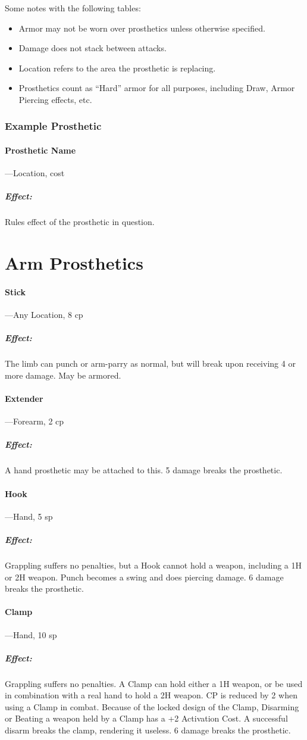 \documentclass[oneside,11pt,english]{book}
\begin{document}
Some notes with the following tables: 
\begin{itemize}
\item Armor may not be worn over prosthetics unless otherwise specified. 
\item Damage does not stack between attacks. 
\item Location refers to the area the prosthetic is replacing. 
\item Prosthetics count as “Hard” armor for all purposes, including Draw, Armor Piercing effects, etc.
\end{itemize}

\subsubsection{Example Prosthetic}
\vspace{-5pt}\paragraph{Prosthetic Name}---\quad Location, cost
\vspace{-15pt}\subparagraph{Effect:} Rules effect of the prosthetic in question.
\section{Arm Prosthetics}
\paragraph{Stick}---\quad Any Location, 8 cp
\vspace{-15pt}
\subparagraph{Effect:} The limb can punch or arm-parry as normal, but will break upon receiving 4 or more damage. May be armored.
\paragraph{Extender}---\quad Forearm, 2 cp
\vspace{-15pt} \subparagraph{Effect:} A hand prosthetic may be attached to this. 5 damage breaks the prosthetic.
\paragraph{Hook}---\quad Hand, 5 sp
\vspace{-15pt} \subparagraph{Effect:} Grappling suffers no penalties, but a Hook cannot hold a weapon, including a 1H or 2H weapon. Punch becomes a swing and does piercing damage. 6 damage breaks the prosthetic.
\paragraph{Clamp}---\quad Hand, 10 sp 
\vspace{-15pt} \subparagraph{Effect:} Grappling suffers no penalties. A Clamp
can hold either a 1H weapon, or be used in combination with a real hand to hold
a 2H weapon. CP is reduced by 2 when using a Clamp in combat. Because of the
locked design of the Clamp, Disarming or Beating a weapon held by a Clamp has a
+2 Activation Cost. A successful disarm breaks the clamp, rendering it useless.
6 damage breaks the prosthetic.  
\end{document}
